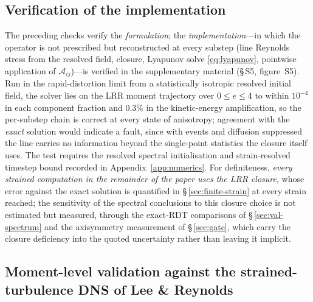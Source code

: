\documentclass[lineno]{JFM-FLM_Au}
\begin{document}
\subsection{Verification of the implementation}\label{sec:level1a}

The preceding checks verify the \emph{formulation}; the
\emph{implementation}---in which the operator is not prescribed but
reconstructed at every substep (line Reynolds stress from the resolved
field, closure, Lyapunov solve \eqref{eq:lyapunov}, pointwise
application of $\mathcal{A}_{ij}$)---is verified in the supplementary
material (\S\,S5, figure~S5). Run in the rapid-distortion limit from a
statistically isotropic resolved initial field, the solver lies on the
LRR moment trajectory over $0\le e\le4$ to within $10^{-4}$ in each
component fraction and $0.3\%$ in the kinetic-energy amplification, so
the per-substep chain is correct at every state of anisotropy;
agreement with the \emph{exact} solution would indicate a fault, since
with events and diffusion suppressed the line carries no information
beyond the single-point statistics the closure itself uses. The test
requires the resolved spectral initialisation and strain-resolved
timestep bound recorded in Appendix~\ref{app:numerics}. For
definiteness, \emph{every strained computation in the remainder of the
paper uses the LRR closure}, whose error against the exact solution is
quantified in \S\,\ref{sec:finite-strain} at every strain reached; the
sensitivity of the spectral conclusions to this closure choice is not
estimated but measured, through the exact-RDT comparisons of
\S\,\ref{sec:val-spectrum} and the axisymmetry measurement of
\S\,\ref{sec:gate}, which carry the closure deficiency into the quoted
uncertainty rather than leaving it implicit.

\subsection{Moment-level validation against the strained-turbulence DNS
of Lee \& Reynolds}\label{sec:lr-validation}\label{sec:lr-plane}
\end{document}
